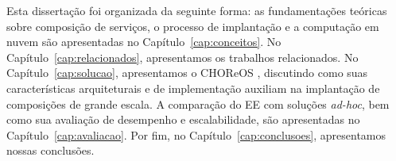 Esta dissertação foi organizada da seguinte forma: as fundamentações teóricas sobre composição de serviços, o processo de implantação e a computação em nuvem são apresentadas no Capítulo~\ref{cap:conceitos}. No Capítulo~\ref{cap:relacionados}, apresentamos os trabalhos relacionados. No Capítulo~\ref{cap:solucao}, apresentamos o CHOReOS \ee, discutindo como suas características arquiteturais e de implementação auxiliam na implantação de composições de grande escala. A comparação do EE com soluções \emph{ad-hoc}, bem como sua avaliação de desempenho e escalabilidade, são apresentadas no Capítulo~\ref{cap:avaliacao}. Por fim, no Capítulo~\ref{cap:conclusoes}, apresentamos nossas conclusões.




